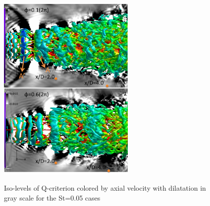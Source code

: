 \documentclass[english]{aiaa-tc}
\begin{document}
\begin{figure}
\begin{center}
\begin{centering}
{\includegraphics[width=2.6in]{M09St005qcritphase0106AB}}
\end{centering}
\caption{Iso-levels of Q-criterion colored by axial velocity with dilatation in gray scale for the St=0.05 cases}
\label{fig:isolevels05}
\end{center}
\end{figure}
\end{document}

